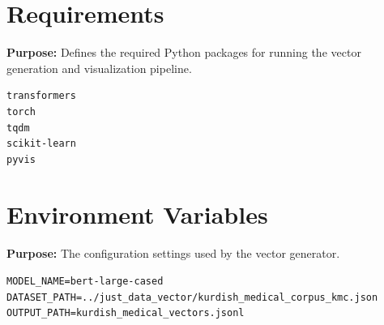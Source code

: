 \documentclass[11pt]{article}
\begin{document}
\section{Requirements} \label{sec:requirements}
\textbf{Purpose:} Defines the required Python packages for running the vector generation and visualization pipeline.

\begin{lstlisting}[style=bashcode, caption={requirements.txt}]
transformers
torch
tqdm
scikit-learn
pyvis
\end{lstlisting}

\section{Environment Variables} \label{sec:env}
\textbf{Purpose:} The configuration settings used by the vector generator.

\begin{lstlisting}[style=bashcode, caption={.env}]
MODEL_NAME=bert-large-cased
DATASET_PATH=../just_data_vector/kurdish_medical_corpus_kmc.json
OUTPUT_PATH=kurdish_medical_vectors.jsonl
\end{lstlisting}
\end{document}
